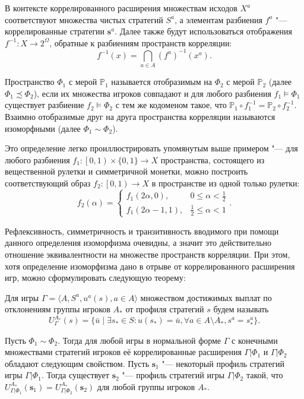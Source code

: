 В контексте коррелированного расширения множествам исходов $X^a$ соответствуют множества чистых стратегий $S^a$, а элементам разбиения $f^a$ "--- коррелированные стратегии $\mathbf{s}^a$. Далее также будут использоваться отображения $f^{-1} : X \rightarrow 2^\Omega$, обратные к разбиениям пространств корреляции:
\begin{equation*}
	f^{-1}(x) = \bigcap_{a \in A} (f^a)^{-1}(x^a).
\end{equation*}
\begin{definition}
	Пространство $\Phi_1$ с мерой $\mathbb{P}_1$ называется отобразимым на $\Phi_2$ с мерой $\mathbb{P}_2$ (далее $\Phi_1 \precsim \Phi_2$), если их множества игроков совпадают и для любого разбиения $f_1 \models \Phi_1$ существует разбиение $f_2 \models \Phi_2$ с тем же кодоменом такое, что $\mathbb{P}_1 \circ f_1^{-1} = \mathbb{P}_2 \circ f_2^{-1}$. Взаимно отобразимые друг на друга пространства корреляции называются изоморфными (далее $\Phi_1 \sim \Phi_2$).
\end{definition}

Это определение легко проиллюстрировать упомянутым выше примером "--- для любого разбиения $f_1 : \left[0, 1\right) \times \{0, 1\} \rightarrow X$ пространства, состоящего из вещественной рулетки и симметричной монетки, можно построить соответствующий образ $f_2 : \left[0, 1\right) \rightarrow X$ в пространстве из одной только рулетки:
\begin{equation*}
	f_2(\alpha) = \begin{cases}
		f_1(2 \alpha, 0), & 0 \le \alpha < \frac{1}{2} \\
		f_1(2 \alpha - 1, 1), & \frac{1}{2} \le \alpha < 1
	\end{cases}.
\end{equation*}

Рефлексивность, симметричность и транзитивность вводимого при помощи данного определения изоморфизма очевидны, а значит это действительно отношение эквивалентности на множестве пространств корреляции. При этом, хотя определение изоморфизма дано в отрыве от коррелированного расширения игр, можно сформулировать следующую теорему:
\begin{definition}
	Для игры $\Gamma = \langle A, S^a, u^a(s), a \in A \rangle$ множеством достижимых выплат по отклонениям группы игроков $A_*$ от профиля стратегий $s$ будем называть
	\begin{equation*}
		U_\Gamma^{A_*}(s) = \{\bar{u} \mid \exists s_* \in S : u(s_*) = \bar{u}, \forall a \in A \setminus A_*, s^a = s_*^a\}.
	\end{equation*}
\end{definition}
\begin{theorem}
	Пусть $\Phi_1 \sim \Phi_2$. Тогда для любой игры в нормальной форме $\Gamma$ с конечными множествами стратегий игроков её коррелированные расширения $\Gamma | \Phi_1$ и $\Gamma | \Phi_2$ обладают следующим свойством. Пусть $\mathbf{s}_1$ "--- некоторый профиль стратегий игры $\Gamma | \Phi_1$. Тогда существует $\mathbf{s}_2$ "--- профиль стратегий игры $\Gamma | \Phi_2$ такой, что $U_{\Gamma | \Phi_1}^{A_*}(\mathbf{s}_1) = U_{\Gamma | \Phi_2}^{A_*}(\mathbf{s}_2)$ для любой группы игроков $A_*$.
\end{theorem}

